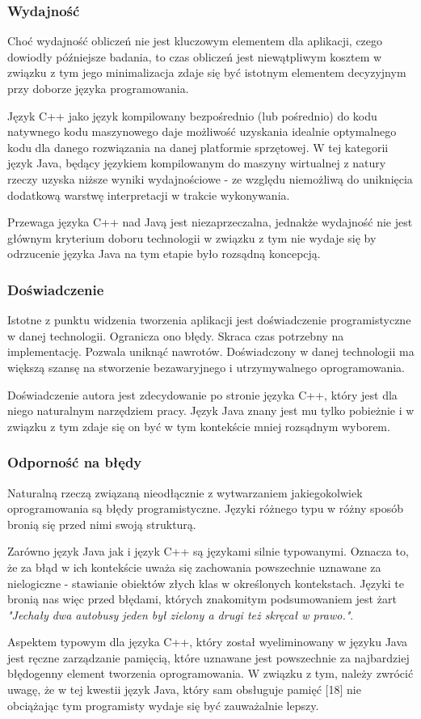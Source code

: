 {\subsubsection{Wydajność}
\par{
Choć wydajność obliczeń nie jest kluczowym elementem dla aplikacji, czego dowiodły późniejsze badania, to czas obliczeń jest niewątpliwym kosztem w związku z tym jego minimalizacja zdaje się być istotnym elementem decyzyjnym przy doborze języka programowania.
}
\par{
Język C++ jako język kompilowany bezpośrednio (lub pośrednio) do kodu natywnego kodu maszynowego daje możliwość uzyskania idealnie optymalnego kodu dla danego rozwiązania na danej platformie sprzętowej. W tej kategorii język Java, będący językiem kompilowanym do maszyny wirtualnej z natury rzeczy uzyska niższe wyniki wydajnościowe - ze względu niemożliwą do uniknięcia dodatkową warstwę interpretacji w trakcie wykonywania.
}
\par{
Przewaga języka C++ nad Javą jest niezaprzeczalna, jednakże wydajność nie jest głównym kryterium doboru technologii w związku z tym nie wydaje się by odrzucenie języka Java na tym etapie było rozsądną koncepcją.
}
\subsubsection{Doświadczenie}
\par{
Istotne z punktu widzenia tworzenia aplikacji jest doświadczenie programistyczne w danej technologii. Ogranicza ono błędy. Skraca czas potrzebny na implementację. Pozwala uniknąć nawrotów. Doświadczony w danej technologii ma większą szansę na stworzenie bezawaryjnego i utrzymywalnego oprogramowania.
}
\par{
Doświadczenie autora jest zdecydowanie po stronie języka C++, który jest dla niego naturalnym narzędziem pracy. Język Java znany jest mu tylko pobieżnie i w związku z tym zdaje się on być w tym kontekście mniej rozsądnym wyborem.
}
\subsubsection{Odporność na błędy}
\par{
Naturalną rzeczą związaną nieodłącznie z wytwarzaniem jakiegokolwiek oprogramowania są błędy programistyczne. Języki różnego typu w różny sposób bronią się przed nimi swoją strukturą.
}
\par{
Zarówno język Java jak i język C++ są językami silnie typowanymi. Oznacza to, że za błąd w ich kontekście uważa się zachowania powszechnie uznawane za nielogiczne - stawianie obiektów złych klas w określonych kontekstach. Języki te bronią nas więc przed błędami, których znakomitym podsumowaniem jest żart \textit{"Jechały dwa autobusy jeden był zielony a drugi też skręcał w prawo."}.
}
\par{
Aspektem typowym dla języka C++, który został wyeliminowany w języku Java jest ręczne zarządzanie pamięcią, które uznawane jest powszechnie za najbardziej błędogenny element tworzenia oprogramowania. W związku z tym, należy zwrócić uwagę, że w tej kwestii język Java, który sam obsługuje pamięć [18] nie obciążając tym programisty wydaje się być zauważalnie lepszy.
}
}
